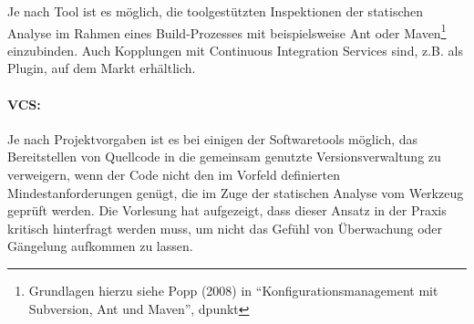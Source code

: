 Je nach Tool ist es möglich, die toolgestützten Inspektionen der statischen Analyse im Rahmen eines Build-Prozesses mit beispielsweise Ant oder Maven\footnote{Grundlagen hierzu siehe Popp (2008) in ``Konfigurationsmanagement mit Subversion, Ant und Maven'', dpunkt} einzubinden. Auch Kopplungen mit Continuous Integration Services sind, z.B. als Plugin, auf dem Markt erhältlich.

\paragraph{VCS:} Je nach Projektvorgaben ist es bei einigen der Softwaretools möglich, das Bereitstellen von Quellcode in die gemeinsam genutzte Versionsverwaltung zu verweigern, wenn der Code nicht den im Vorfeld definierten Mindestanforderungen genügt, die im Zuge der statischen Analyse vom Werkzeug geprüft werden. Die Vorlesung hat aufgezeigt, dass dieser Ansatz in der Praxis kritisch hinterfragt werden muss, um nicht das Gefühl von Überwachung oder Gängelung aufkommen zu lassen.
